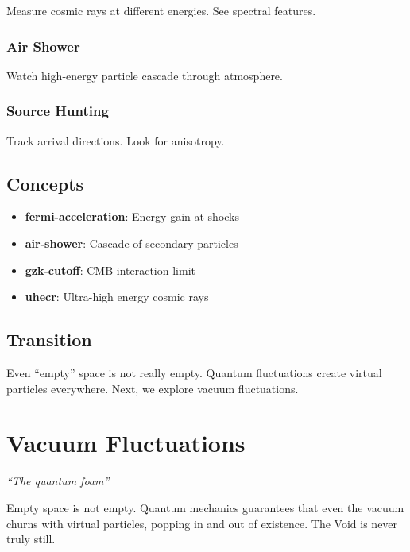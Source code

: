 \documentclass[
  11pt,
  letterpaper,
  twoside,
  openright]{book}
\providecommand{\tightlist}{%
  \setlength{\itemsep}{0pt}\setlength{\parskip}{0pt}}
\begin{document}
Measure cosmic rays at different energies. See spectral features.

\subsection{Air Shower}\label{air-shower}

Watch high-energy particle cascade through atmosphere.

\subsection{Source Hunting}\label{source-hunting}

Track arrival directions. Look for anisotropy.

\section{Concepts}\label{concepts-34}

\begin{itemize}
\tightlist
\item
  \textbf{fermi-acceleration}: Energy gain at shocks
\item
  \textbf{air-shower}: Cascade of secondary particles
\item
  \textbf{gzk-cutoff}: CMB interaction limit
\item
  \textbf{uhecr}: Ultra-high energy cosmic rays
\end{itemize}

\section{Transition}\label{transition-35}

Even ``empty'' space is not really empty. Quantum fluctuations create
virtual particles everywhere. Next, we explore vacuum fluctuations.

\chapter{Vacuum Fluctuations}\label{sec-vacuum-fluctuations}

\emph{``The quantum foam''}

\begin{tcolorbox}[enhanced jigsaw, coltitle=black, colbacktitle=quarto-callout-note-color!10!white, toprule=.15mm, colframe=quarto-callout-note-color-frame, arc=.35mm, opacityback=0, bottomtitle=1mm, toptitle=1mm, breakable, colback=white, titlerule=0mm, opacitybacktitle=0.6, title=\textcolor{quarto-callout-note-color}{\faInfo}\hspace{0.5em}{Key Revelation}, rightrule=.15mm, bottomrule=.15mm, leftrule=.75mm, left=2mm]

Empty space is not empty. Quantum mechanics guarantees that even the
vacuum churns with virtual particles, popping in and out of existence.
The Void is never truly still.

\end{tcolorbox}
\end{document}
